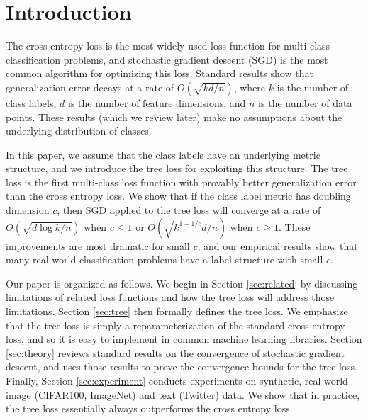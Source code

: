 \documentclass[twoside]{article}
\begin{document}
\section{Introduction}


The cross entropy loss is the most widely used loss function for multi-class classification problems,
and stochastic gradient descent (SGD) is the most common algorithm for optimizing this loss.
Standard results show that generalization error decays at a rate of $O(\sqrt{kd/n})$,
where $k$ is the number of class labels, $d$ is the number of feature dimensions, and $n$ is the number of data points.
These results (which we review later) make no assumptions about the underlying distribution of classes.

In this paper,
we assume that the class labels have an underlying metric structure,
and we introduce the tree loss for exploiting this structure.
The tree loss is the first multi-class loss function with provably better generalization error than the cross entropy loss.
We show that if the class label metric has doubling dimension $c$,
then SGD applied to the tree loss will converge at a rate of $O(\sqrt{d \log k/n})$ when $c\le 1$ or $O(\sqrt{k^{1-1/c}d/n})$ when $c\ge 1$.
These improvements are most dramatic for small $c$,
and our empirical results show that many real world classification problems have a label structure with small $c$.

Our paper is organized as follows.
We begin in Section \ref{sec:related} by discussing limitations of related loss functions and how the tree loss will address those limitations.
Section \ref{sec:tree} then formally defines the tree loss.
We emphasize that the tree loss is simply a reparameterization of the standard cross entropy loss,
and so it is easy to implement in common machine learning libraries.
Section \ref{sec:theory} reviews standard results on the convergence of stochastic gradient descent,
and uses those results to prove the convergence bounds for the tree loss.
Finally, Section \ref{sec:experiment} conducts experiments on synthetic, real world image (CIFAR100, ImageNet) and text (Twitter) data.
We show that in practice, the tree loss essentially always outperforms the cross entropy loss.
\end{document}
